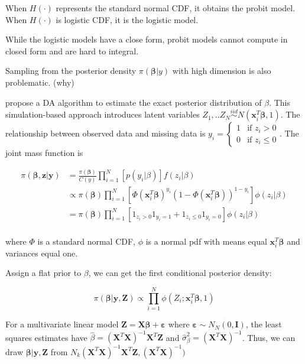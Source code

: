 \documentclass[12pt]{article}
\begin{document}
When \(H(\cdot)\) represents the standard normal CDF, it obtains the
probit model. When \(H(\cdot)\) is logistic CDF, it is the logistic
model.

While the logistic models have a close form, probit models cannot
compute in closed form and are hard to integral.

Sampling from the posterior density \(\pi(\boldsymbol{\beta}|y)\) with
high dimension is also problematic. (why)

\citet{albertBayesianAnalysisBinary1993} propose a DA algorithm to
estimate the exact posterior distribution of \(\beta\). This
simulation-based approach introduces latent variables
\(Z_1,..Z_N\overset{iid}{\sim} N(\mathbf{x}_i^T\boldsymbol{\beta},1)\).
The relationship between observed data and missing data is
\(y_i=\begin{cases}1&\text{if } z_i>0\\0&\text{if }z_i\le0\end{cases}\).
The joint mass function is

\[\begin{aligned}
\pi(\boldsymbol{\beta,z|y}) &= \frac{\pi(\boldsymbol{\beta})}{C(y)}\prod_{i=1}^{N}[p(y_i|\beta)]f(z_i|\beta)\\
&\propto\pi(\boldsymbol{\beta})\prod_{i=1}^{N}\left[\Phi (\mathbf{x}_i^T\boldsymbol{\beta})^{y_i}(1-\Phi(\mathbf{x}_i^T\boldsymbol{\beta}))^{1-y_i}\right]\phi (z_{i}|\beta)\\
&=\pi(\boldsymbol{\beta})\prod_{i=1}^{N}\left[1_{z_i>0}1_{y_i=1}+1_{z_i\le0}1_{y_i=0}\right]\phi (z_{i}|\beta)\\
\end{aligned}\]

where \(\Phi\) is a standard normal CDF, \(\phi\) is a normal pdf with
means equal \(\mathbf{x}_i^T\boldsymbol{\beta}\) and variances equal
one.

Assign a flat prior to \(\beta\), we can get the first conditional
posterior density:

\[\pi(\boldsymbol{\beta|y,Z})\propto \prod_{i=1}^{N}\phi (Z_{i};\mathbf{x}_i^T\boldsymbol{\beta},1)\]

For a multivariate linear model
\(\mathbf{Z}=\mathbf{X}\boldsymbol{\beta+\varepsilon}\) where
\(\boldsymbol{\varepsilon}\sim N_N(0,\mathbf{I})\), the least squares
estimates have
\(\hat\beta=(\mathbf{X}^T\mathbf{X})^{-1}\mathbf{X}^T\mathbf{Z}\) and
\(\hat\sigma^2_\beta=(\mathbf{X}^T\mathbf{X})^{-1}\). Thus, we can draw
\(\boldsymbol{\beta|y,Z}\) from
\(N_k(\mathbf{X}^T\mathbf{X})^{-1}\mathbf{X}^T\mathbf{Z},(\mathbf{X}^T\mathbf{X})^{-1})\)
\end{document}

